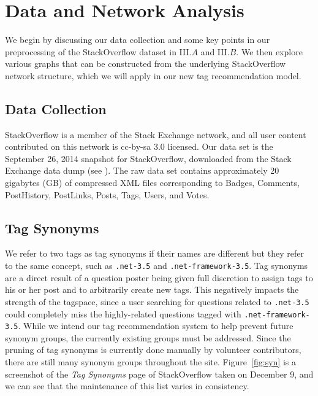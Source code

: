 \documentclass[11pt]{IEEEtran}
\begin{document}
\section{Data and Network Analysis}

We begin by discussing our data collection and some key points in our preprocessing of the StackOverflow dataset in III.$A$ and III.$B$. We then explore various graphs that can be constructed from the underlying StackOverflow network structure, which we will apply in our new tag recommendation model.

\subsection{Data Collection}

StackOverflow is a member of the Stack Exchange network, and all user content contributed on this network is cc-by-sa 3.0 licensed. Our data set is the September 26, 2014 snapshot for StackOverflow, downloaded from the Stack Exchange data dump (see \cite{6}). The raw data set contains approximately 20 gigabytes (GB) of compressed XML files corresponding to Badges, Comments, PostHistory, PostLinks, Posts, Tags, Users, and Votes.

\subsection{Tag Synonyms}

We refer to two tags as tag synonyms if their names are different but they refer to the same concept, such as \texttt{.net-3.5} and \texttt{.net-framework-3.5}. Tag synonyms are a direct result of a question poster being given full discretion to assign tags to his or her post and to arbitrarily create new tags. This negatively impacts the strength of the tagspace, since a user searching for questions related to \texttt{.net-3.5} could completely miss the highly-related questions tagged with \texttt{.net-framework-3.5}. While we intend our tag recommendation system to help prevent future synonym groups, the currently existing groups must be addressed.  Since the pruning of tag synonyms is currently done manually by volunteer contributors, there are still many synonym groups throughout the site. Figure~\ref{fig:syn} is a screenshot of the \textit{Tag Synonyms} page of StackOverflow taken on December 9, and we can see that the maintenance of this list varies in consistency.\\
\end{document}
